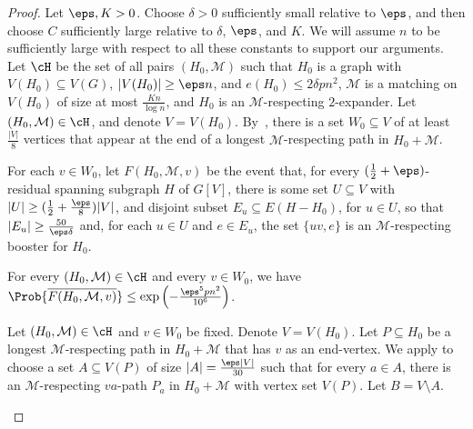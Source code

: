 \documentclass[10pt,a4paper,reqno]{amsart}
\begin{document}
\begin{proof}
Let $\eps, K >0$. Choose $\delta >0$ sufficiently small relative to $\eps$, and then choose $C$ sufficiently large relative to $\delta$, $\eps$, and $K$. We will assume $n$ to be sufficiently large with respect to all these constants to support our arguments.
Let $\cH$ be the set of all pairs $(H_0, \mathcal{M})$ such that $H_0$ is a graph with $V(H_0)\subseteq V(G)$, $|V(H_0)|\ge \eps n$, and $e(H_0)\le 2\delta p n^2$, $\mathcal{M}$ is a matching on $V(H_0)$ of size at most $\frac{K n}{\log{n}}$, and $H_0$ is an $\mathcal{M}$-respecting $2$-expander. Let $(H_0, \mathcal{M}) \in \cH$, and denote $V = V(H_0)$. By~, there is a set $W_0\subseteq V$ of at least $\frac{|V|}{8}$ vertices that appear at the end of a longest $\mathcal{M}$-respecting path in $H_0 + \mathcal{M}$.

For each $v \in W_0$, let $F(H_0, \mathcal{M}, v)$ be the event that, for every $(\frac{1}{2} + \eps)$-residual spanning subgraph $H$ of $G[V]$, there is some set $U \subseteq V$ with $|U| \geq (\frac{1}{2} + \frac{\eps}{8})|V|$, and disjoint subset  $E_u \subseteq E(H - H_0)$, for $u \in U$, so that $|E_u| \geq \frac{50}{\eps \delta}$ and, for each $u \in U$ and $e \in E_u$, the set $\{uv, e\}$ is an $\mathcal{M}$-respecting booster for $H_0$.

\begin{claim}\label{claim:prob-not-FHv}
    For every $(H_0, \mathcal{M}) \in \cH$ and every $v \in W_0$, we have $\Prob{\overline{F(H_0, \mathcal{M}, v)}} \leq \exp\left(-\frac{\eps^5 pn^2}{10^6}\right)$.
\end{claim}
\begin{claimproof}
Let $(H_0, \mathcal{M}) \in \cH$ and $v \in W_0$ be fixed. Denote $V=V(H_0)$. Let $P \subseteq H_0$ be a longest $\mathcal{M}$-respecting path in $H_0 + \mathcal{M}$ that has $v$ as an end-vertex. We apply  to choose a set $A \subseteq V(P)$ of size $|A| = \frac{\eps |V|}{30}$ such that for every $a\in A$, there is an $\mathcal{M}$-respecting $va$-path $P_a$ in $H_0 + \mathcal{M}$ with vertex set $V(P)$. Let $B = V \setminus A$. 
    

\end{claimproof}
\end{proof}
\end{document}
